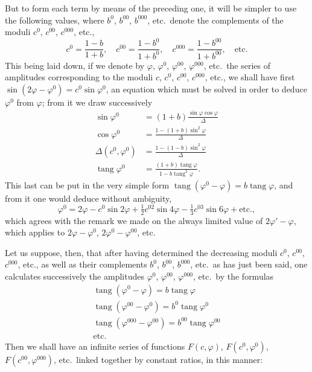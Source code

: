 \documentclass{article}
\begin{document}
But to form each term by means of the preceding one, it will be simpler to use the following values, where $b^{0}$, $b^{00}$, $b^{000}$, etc.\ denote the complements of the moduli $c^{0}$, $c^{00}$, $c^{000}$, etc.,
\[ c^{0}=\frac{1-b}{1+b},\quad c^{00}=\frac{1-b^{0}}{1+b^{0}},\quad c^{000}=\frac{1-b^{00}}{1+b^{00}},\quad\text{etc.} \]
This being laid down, if we denote by $\varphi$, $\varphi^{0}$, $\varphi^{00}$, $\varphi^{000}$, etc.\ the series of amplitudes corresponding to the moduli $c$, $c^{0}$, $c^{00}$, $c^{000}$, etc., we shall have first $\sin(2\varphi-\varphi^{0})=c^{0}\sin\varphi^{0}$, an equation which must be solved in order to deduce $\varphi^{0}$ from $\varphi$; from it we draw successively
\[ \begin{aligned} \sin\varphi^{0}&=(1+b)\frac{\sin\varphi\cos\varphi}{\Delta}\\ \cos\varphi^{0}&=\frac{1-(1+b)\sin^{2}\varphi}{\Delta}\\ \Delta(c^{0},\varphi^{0})&=\frac{1-(1-b)\sin^{2}\varphi}{\Delta}\\ \operatorname{tang}\varphi^{0}&=\frac{(1+b)\operatorname{tang}\varphi}{1-b\operatorname{tang}^{2}\varphi}. \end{aligned} \]
This last can be put in the very simple form $\operatorname{tang}(\varphi^{0}-\varphi)=b\operatorname{tang}\varphi$, and from it one would deduce without ambiguity,
\[ \varphi^{0}=2\varphi-c^{0}\sin2\varphi+\tfrac{1}{2}c^{02}\sin4\varphi-\tfrac{1}{3}c^{03}\sin6\varphi+\text{etc.}, \]
which agrees with the remark we made on the always limited value of $2\varphi'-\varphi$, which applies to $2\varphi-\varphi^{0}$, $2\varphi^{0}-\varphi^{00}$, etc.

Let us suppose, then, that after having determined the decreasing moduli $c^{0}$, $c^{00}$, $c^{000}$, etc., as well as their complements $b^{0}$, $b^{00}$, $b^{000}$, etc.\ as has just been said, one calculates successively the amplitudes $\varphi^{0}$, $\varphi^{00}$, $\varphi^{000}$, etc.\ by the formulas
\[ \begin{gathered} \operatorname{tang}(\varphi^{0}-\varphi)=b\operatorname{tang}\varphi\\ \operatorname{tang}(\varphi^{00}-\varphi^{0})=b^{0}\operatorname{tang}\varphi^{0}\\ \operatorname{tang}(\varphi^{000}-\varphi^{00})=b^{00}\operatorname{tang}\varphi^{00}\\ \text{etc.} \end{gathered} \]
Then we shall have an infinite series of functions $F(c,\varphi)$, $F(c^{0},\varphi^{0})$, $F(c^{00},\varphi^{000})$, etc.\ linked together by constant ratios, in this manner:
\end{document}
